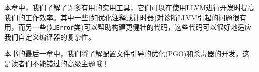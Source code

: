 本章中，我们了解了许多有用的实用工具，它们可以在使用LLVM进行开发时提高我们的工作效率。其中一些(如优化注释或计时器)对诊断LLVM引起的问题很有用，而另一些(如\texttt{Error}类)可以帮助构建更健壮的代码，这些代码可以很好地适应我们自定义编译器的复杂性。

本书的最后一章中，我们将了解配置文件引导的优化(PGO)和杀毒器的开发，这是读者们不能错过的高级主题哦！
